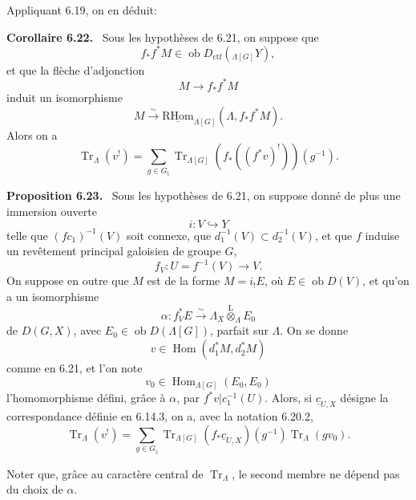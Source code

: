 \documentclass[11pt]{article}
\newenvironment{statement}[1]{\par\medskip\noindent\textbf{#1.}\ }{\par\medskip}
\DeclareMathOperator{\Hom}{Hom}
\providecommand{\RHom}{\mathrm{RHom}}
\providecommand{\uRHom}{\underline{\RHom}}
\providecommand{\Tr}{\operatorname{Tr}}
\providecommand{\Tr}{\operatorname{Tr}}
\providecommand{\lten}{\overset{\mathrm L}{\otimes}}
\providecommand{\Ob}{\operatorname{ob}}
\providecommand{\Tr}{\operatorname{Tr}}
\providecommand{\RHom}{\mathrm{RHom}}
\providecommand{\Hom}{\operatorname{Hom}}
\providecommand{\lten}{\overset{\mathrm L}{\otimes}}
\providecommand{\RHom}{\mathrm R\mathcal{H}om}
\providecommand{\lten}{\overset{\mathrm L}{\otimes}}
\providecommand{\Ob}{\operatorname{ob}}
\providecommand{\Tr}{\operatorname{Tr}}
\providecommand{\lten}{\overset{\mathrm L}{\otimes}}
\providecommand{\lten}{\overset{\mathrm L}{\otimes}}
\providecommand{\Ob}{\operatorname{Ob}}
\providecommand{\lten}{\overset{\mathrm L}{\otimes}}
\providecommand{\RHom}{\mathrm{RHom}}
\providecommand{\Hom}{\operatorname{Hom}}
\providecommand{\Tr}{\operatorname{Tr}}
\providecommand{\Ob}{\operatorname{ob}}
\providecommand{\Ob}{\operatorname{Ob}}
\providecommand{\lten}{\overset{\mathrm L}{\otimes}}
\begin{document}
Appliquant 6.19, on en déduit:

\begin{statement}{Corollaire 6.22}
Sous les hypothèses de 6.21, on suppose que
\[
f_*f^*M\in\Ob D_{\mathrm{ctf}}({}_{\Lambda[G]}Y),
\]
et que la flèche d'adjonction
\[
M\to f_*f^*M
\]
induit un isomorphisme
\[
M\xrightarrow{\sim}\uRHom_{\Lambda[G]}(\Lambda,f_*f^*M).
\]
Alors on a
\begin{equation}
\Tr_{\Lambda}(v^!)=
\sum_{g\in G_{\natural}}\Tr_{\Lambda[G]}(f_*((f^*v)^!))(g^{-1}).
\tag{6.22.1}
\end{equation}
\end{statement}

\begin{statement}{Proposition 6.23}
Sous les hypothèses de 6.21, on suppose donné de plus une immersion ouverte
\[
i:V\hookrightarrow Y
\]
telle que $(fc_1)^{-1}(V)$ soit connexe, que $d_1^{-1}(V)\subset d_2^{-1}(V)$, et que $f$ induise un revêtement principal galoisien de groupe $G$,
\[
f_V:U=f^{-1}(V)\to V.
\]
On suppose en outre que $M$ est de la forme $M=i_!E$, où $E\in\Ob D(V)$, et qu'on a un isomorphisme
\[
\alpha:f_V^*E\xrightarrow{\sim}\Lambda_X\lten_{\Lambda}E_0
\]
de $D(G,X)$, avec $E_0\in\Ob D(\Lambda[G])$, parfait sur $\Lambda$. On se donne
\[
v\in\Hom(d_1^*M,d_2^*M)
\]
comme en 6.21, et l'on note
\[
v_0\in\Hom_{\Lambda[G]}(E_0,E_0)
\]
l'homomorphisme défini, grâce à $\alpha$, par $f^*v|c_1^{-1}(U)$. Alors, si $\underline c_{U,X}$ désigne la correspondance définie en 6.14.3, on a, avec la notation 6.20.2,
\begin{equation}
\Tr_{\Lambda}(v^!)
=
\sum_{g\in G_{\natural}}
\Tr_{\Lambda[G]}(f_*\underline c_{U,X})(g^{-1})\Tr_{\Lambda}(gv_0).
\tag{6.23.1}
\end{equation}
\end{statement}

Noter que, grâce au caractère central de $\Tr_{\Lambda}$, le second membre ne dépend pas du choix de $\alpha$.
\end{document}
